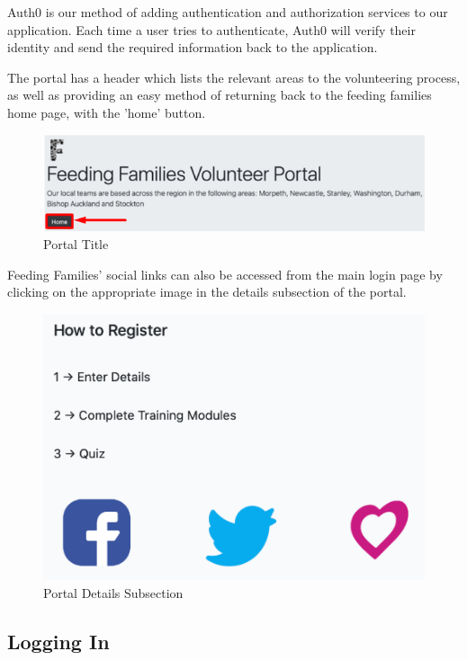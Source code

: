 \documentclass[12pt]{article}
\begin{document}
Auth0 is our method of adding authentication and authorization services to our application. Each time a user tries to authenticate, Auth0 will verify their identity and send the required information back to the application. 
\newpage

The portal has a header which lists the relevant areas to the volunteering process, as well as providing an easy method of returning back to the feeding families home page, with the 'home' button.

\begin{figure}[h]
    \centering
    \includegraphics[scale=0.8]{main/rsz_portaltitle.png}
    \caption{Portal Title}
    \label{fig2}
\end{figure}

Feeding Families' social links can also be accessed from the main login page by clicking on the appropriate image in the details subsection of the portal.

\begin{figure}[h]
    \centering
    \includegraphics[scale=0.9]{main/registerlinks.png}
    \caption{Portal Details Subsection}
    \label{fig3}
\end{figure}
\newpage
\vspace{1.0cm}

\subsection{Logging In}
\end{document}
